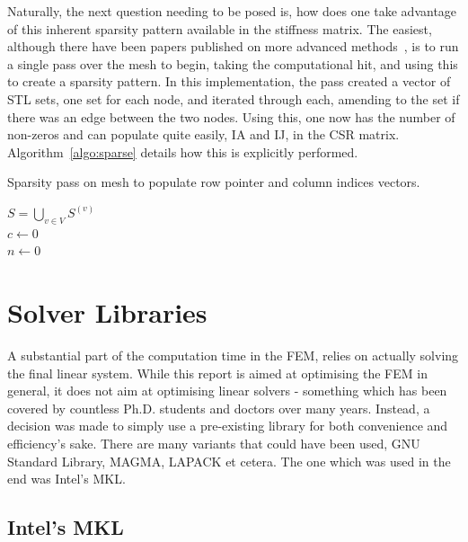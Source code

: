 Naturally, the next question needing to be posed is, how does one take advantage of this inherent sparsity pattern available in the stiffness matrix. The easiest, although there have been papers published on more advanced methods~\cite{sparse}, is to run a single pass over the mesh to begin, taking the computational hit, and using this to create a sparsity pattern. In this implementation, the pass created a vector of STL sets, one set for each node, and iterated through each, amending to the set if there was an edge between the two nodes. Using this, one now has the number of non-zeros and can populate quite easily, IA and IJ, in the CSR matrix. Algorithm~\ref{algo:sparse} details how this is explicitly performed.
\begin{algorithm}
	\caption{Sparsity pass on mesh to populate row pointer and column indices vectors.}
	\label{algo:sparse}
	$S = \bigcup_{v \in V} S^{(v)}$\\
	$c \leftarrow 0$\\
	$n \leftarrow 0$\\
\end{algorithm}

\section{Solver Libraries}

A substantial part of the computation time in the FEM, relies on actually solving the final linear system. While this report is aimed at optimising the FEM in general, it does not aim at optimising linear solvers - something which has been covered by countless Ph.D. students and doctors over many years. Instead, a decision was made to simply use a pre-existing library for both convenience and efficiency's sake. There are many variants that could have been used, GNU Standard Library, MAGMA, LAPACK et cetera. The one which was used in the end was Intel's MKL.

\subsection{Intel's MKL}\label{mkl}

